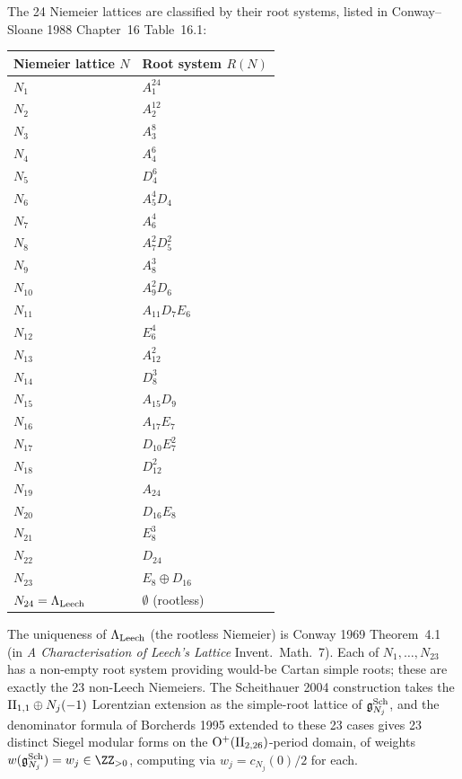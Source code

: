 The 24 Niemeier lattices are classified by their root systems, listed
in Conway--Sloane 1988 Chapter~16 Table~16.1:
\begin{center}
\begin{tabular}{|l|l|}
\hline
Niemeier lattice $N$ & Root system $R(N)$ \\
\hline
$N_1$ & $A_1^{24}$ \\
$N_2$ & $A_2^{12}$ \\
$N_3$ & $A_3^{8}$ \\
$N_4$ & $A_4^{6}$ \\
$N_5$ & $D_4^{6}$ \\
$N_6$ & $A_5^{4} D_4$ \\
$N_7$ & $A_6^{4}$ \\
$N_8$ & $A_7^{2} D_5^{2}$ \\
$N_9$ & $A_8^{3}$ \\
$N_{10}$ & $A_9^{2} D_6$ \\
$N_{11}$ & $A_{11} D_7 E_6$ \\
$N_{12}$ & $E_6^{4}$ \\
$N_{13}$ & $A_{12}^{2}$ \\
$N_{14}$ & $D_8^{3}$ \\
$N_{15}$ & $A_{15} D_9$ \\
$N_{16}$ & $A_{17} E_7$ \\
$N_{17}$ & $D_{10} E_7^{2}$ \\
$N_{18}$ & $D_{12}^{2}$ \\
$N_{19}$ & $A_{24}$ \\
$N_{20}$ & $D_{16} E_8$ \\
$N_{21}$ & $E_8^{3}$ \\
$N_{22}$ & $D_{24}$ \\
$N_{23}$ & $E_8 \oplus D_{16}$ \\
$N_{24} = \Lambda_{\mathrm{Leech}}$ & $\emptyset$ (rootless) \\
\hline
\end{tabular}
\end{center}

The uniqueness of $\Lambda_{\mathrm{Leech}}$ (the rootless Niemeier) is Conway 1969
Theorem~4.1 (in \emph{A Characterisation of Leech's Lattice}
Invent.\ Math.\ 7). Each of $N_1, \ldots, N_{23}$ has a non-empty
root system providing would-be Cartan simple roots; these are
exactly the 23 non-Leech Niemeiers. The Scheithauer 2004
construction takes the $\mathrm{II}_{1,1} \oplus N_j(-1)$ Lorentzian
extension as the simple-root lattice of $\mathfrak{g}^{\mathrm{Sch}}_{N_j}$, and the
denominator formula of Borcherds 1995 extended to these 23 cases
gives 23 distinct Siegel modular forms on the
$\mathrm{O}^+(\mathrm{II}_{2,26})$-period domain, of weights
$w(\gSch_{N_j}) = w_j \in \ZZ_{>0}$, computing via
$w_j = c_{N_j}(0)/2$ for each.

